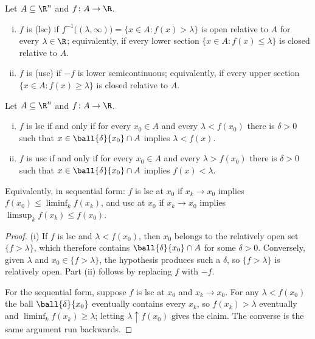 \begin{definition}[Semicontinuity]\label{def:semicontinuity}
	Let $A\subseteq\R^n$ and $f\colon A\to\R$.
	\begin{enumerate}[(i)]
		\item $f$ is  (lsc) if
		      $f^{-1}\bigl((\lambda,\infty)\bigr)=\{x\in A : f(x)>\lambda\}$ is open
		      relative to $A$ for every $\lambda\in\R$; equivalently, if every lower
		      section $\{x\in A: f(x)\leq\lambda\}$ is closed relative to $A$.
		\item $f$ is  (usc) if $-f$
		      is lower semicontinuous; equivalently, if every upper section
		      $\{x\in A: f(x)\geq\lambda\}$ is closed relative to $A$.
	\end{enumerate}
\end{definition}

\begin{proposition}\label{prop:semicontinuity-pointwise}
	Let $A\subseteq\R^n$ and $f\colon A\to\R$.
	\begin{enumerate}[(i)]
		\item $f$ is lsc if and only if for every $x_0\in A$ and every
		      $\lambda<f(x_0)$ there is $\delta>0$ such that
		      $x\in\ball{\delta}{x_0}\cap A$ implies $\lambda<f(x)$.
		\item $f$ is usc if and only if for every $x_0\in A$ and every
		      $\lambda>f(x_0)$ there is $\delta>0$ such that
		      $x\in\ball{\delta}{x_0}\cap A$ implies $f(x)<\lambda$.
	\end{enumerate}
	Equivalently, in sequential form: $f$ is lsc at $x_0$ if
	$x_k\to x_0$ implies $f(x_0)\leq\liminf_kf(x_k)$, and usc at $x_0$ if
	$x_k\to x_0$ implies $\limsup_kf(x_k)\leq f(x_0)$.
\end{proposition}

\begin{proof}
	(i) If $f$ is lsc and $\lambda<f(x_0)$, then $x_0$ belongs to the relatively open
	set $\{f>\lambda\}$, which therefore contains
	$\ball{\delta}{x_0}\cap A$ for some $\delta>0$. Conversely, given $\lambda$ and
	$x_0\in\{f>\lambda\}$, the hypothesis produces such a $\delta$, so
	$\{f>\lambda\}$ is relatively open. Part (ii) follows by replacing $f$ with
	$-f$.

	For the sequential form, suppose $f$ is lsc at $x_0$ and $x_k\to x_0$. For any
	$\lambda<f(x_0)$ the ball $\ball{\delta}{x_0}$ eventually contains every $x_k$,
	so $f(x_k)>\lambda$ eventually and $\liminf_kf(x_k)\geq\lambda$; letting
	$\lambda\uparrow f(x_0)$ gives the claim. The converse is the same argument run
	backwards.
\end{proof}

